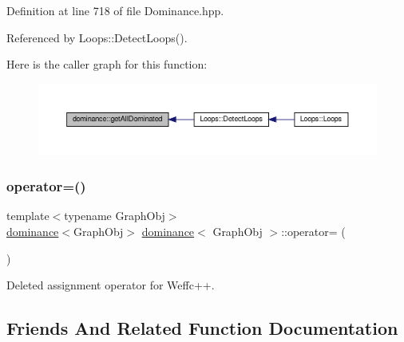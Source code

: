 Definition at line 718 of file Dominance.\+hpp.



Referenced by Loops\+::\+Detect\+Loops().

Here is the caller graph for this function\+:
\nopagebreak
\begin{figure}[H]
\begin{center}
\leavevmode
\includegraphics[width=350pt]{d1/d93/classdominance_a806e173d4c1bc8dea71e9b24d5868856_icgraph}
\end{center}
\end{figure}
\mbox{\label{classdominance_a1c7f50c3b50939b22ecde9bc0ffcb28d}} 
\subsubsection{\texorpdfstring{operator=()}{operator=()}}
{\footnotesize\ttfamily template$<$typename Graph\+Obj$>$ \\
\hyperlink{classdominance}{dominance}$<$Graph\+Obj$>$ \hyperlink{classdominance}{dominance}$<$ Graph\+Obj $>$\+::operator= (\begin{DoxyParamCaption}\item[{const \hyperlink{classdominance}{dominance}$<$ Graph\+Obj $>$ \&}]{ }\end{DoxyParamCaption})\hspace{0.3cm}{\ttfamily [delete]}}



Deleted assignment operator for Weffc++. 



\subsection{Friends And Related Function Documentation}
\mbox{\label{classdominance_aaa74bc08e8734cd3e20273fb6092781a}} 

